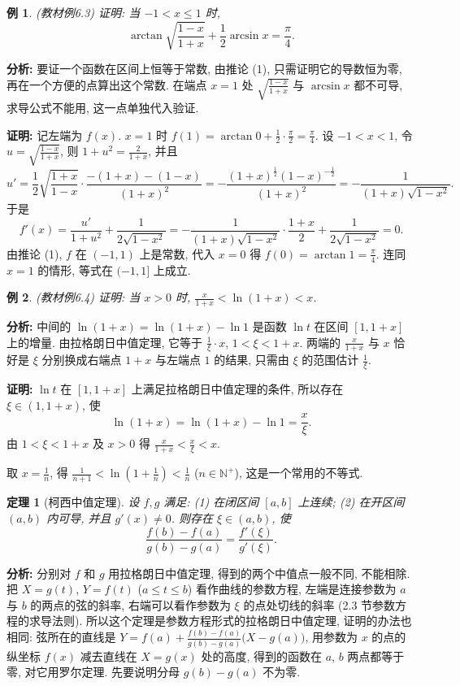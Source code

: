 \documentclass[UTF8,openany]{ctexbook}
\theoremstyle{chinesetextbook}
\newtheorem{example}{例}[section]
\newtheorem{theorem}{定理}[section]
\newenvironment{cnproof}{\par\indent\textbf{证明:} \ignorespaces}{\par}
\begin{document}
\begin{example}\label{ex:c2-6-3}
\textnormal{(教材例6.3)} 证明: 当 $-1<x\le1$ 时,
\[
\arctan\sqrt{\frac{1-x}{1+x}}+\frac12\arcsin x=\frac\pi4.
\]
\end{example}
\par\indent\textbf{分析:} 要证一个函数在区间上恒等于常数, 由推论 (1), 只需证明它的导数恒为零, 再在一个方便的点算出这个常数. 在端点 $x=1$ 处 $\displaystyle\sqrt{\frac{1-x}{1+x}}$ 与 $\arcsin x$ 都不可导, 求导公式不能用, 这一点单独代入验证.
\begin{cnproof}
记左端为 $f(x)$. $x=1$ 时 $\displaystyle f(1)=\arctan0+\frac12\cdot\frac\pi2=\frac\pi4$. 设 $-1<x<1$, 令 $\displaystyle u=\sqrt{\frac{1-x}{1+x}}$, 则 $\displaystyle1+u^2=\frac2{1+x}$, 并且
\[
u'=\frac12\sqrt{\frac{1+x}{1-x}}\cdot\frac{-(1+x)-(1-x)}{(1+x)^2}=-\frac{(1+x)^{\frac12}(1-x)^{-\frac12}}{(1+x)^2}=-\frac1{(1+x)\sqrt{1-x^2}}.
\]
于是
\[
f'(x)=\frac{u'}{1+u^2}+\frac1{2\sqrt{1-x^2}}=-\frac1{(1+x)\sqrt{1-x^2}}\cdot\frac{1+x}2+\frac1{2\sqrt{1-x^2}}=0.
\]
由推论 (1), $f$ 在 $(-1,1)$ 上是常数, 代入 $x=0$ 得 $\displaystyle f(0)=\arctan1=\frac\pi4$. 连同 $x=1$ 的情形, 等式在 $(-1,1]$ 上成立.
\end{cnproof}
\begin{example}\label{ex:c2-6-4}
\textnormal{(教材例6.4)} 证明: 当 $x>0$ 时, $\displaystyle\frac x{1+x}<\ln(1+x)<x$.
\end{example}
\par\indent\textbf{分析:} 中间的 $\ln(1+x)=\ln(1+x)-\ln1$ 是函数 $\ln t$ 在区间 $[1,1+x]$ 上的增量. 由拉格朗日中值定理, 它等于 $\displaystyle\frac1\xi\cdot x$, $1<\xi<1+x$. 两端的 $\displaystyle\frac x{1+x}$ 与 $x$ 恰好是 $\xi$ 分别换成右端点 $1+x$ 与左端点 $1$ 的结果, 只需由 $\xi$ 的范围估计 $\displaystyle\frac1\xi$.
\begin{cnproof}
$\ln t$ 在 $[1,1+x]$ 上满足拉格朗日中值定理的条件, 所以存在 $\xi\in(1,1+x)$, 使
\[
\ln(1+x)=\ln(1+x)-\ln1=\frac x\xi.
\]
由 $1<\xi<1+x$ 及 $x>0$ 得 $\displaystyle\frac x{1+x}<\frac x\xi<x$.
\end{cnproof}
取 $\displaystyle x=\frac1n$, 得 $\displaystyle\frac1{n+1}<\ln\left(1+\frac1n\right)<\frac1n$ ($n\in\mathbb N^+$), 这是一个常用的不等式.
\begin{theorem}[柯西中值定理]\label{thm:c2-6-cauchy}
设 $f,g$ 满足: (1) 在闭区间 $[a,b]$ 上连续; (2) 在开区间 $(a,b)$ 内可导, 并且 $g'(x)\ne0$. 则存在 $\xi\in(a,b)$, 使
\[
\frac{f(b)-f(a)}{g(b)-g(a)}=\frac{f'(\xi)}{g'(\xi)}.
\]
\end{theorem}
\par\indent\textbf{分析:} 分别对 $f$ 和 $g$ 用拉格朗日中值定理, 得到的两个中值点一般不同, 不能相除. 把 $X=g(t)$, $Y=f(t)$ ($a\le t\le b$) 看作曲线的参数方程, 左端是连接参数为 $a$ 与 $b$ 的两点的弦的斜率, 右端可以看作参数为 $\xi$ 的点处切线的斜率 (2.3 节参数方程的求导法则). 所以这个定理是参数方程形式的拉格朗日中值定理, 证明的办法也相同: 弦所在的直线是 $\displaystyle Y=f(a)+\frac{f(b)-f(a)}{g(b)-g(a)}\bigl(X-g(a)\bigr)$, 用参数为 $x$ 的点的纵坐标 $f(x)$ 减去直线在 $X=g(x)$ 处的高度, 得到的函数在 $a$, $b$ 两点都等于零, 对它用罗尔定理. 先要说明分母 $g(b)-g(a)$ 不为零.
\end{document}
